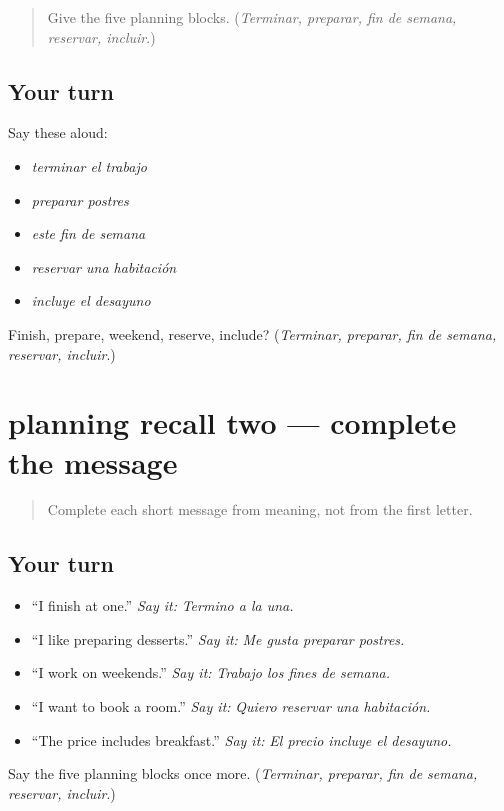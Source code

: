 \label{lesson:ES-C409-planning-recall-1}



\begin{quote}
Give the five planning blocks. (\emph{Terminar, preparar, fin de semana, reservar, incluir}.)
\end{quote}

\subsection*{Your turn}
Say these aloud:

\begin{itemize}
\raggedright
  \item \emph{terminar el trabajo}
  \item \emph{preparar postres}
  \item \emph{este fin de semana}
  \item \emph{reservar una habitación}
  \item \emph{incluye el desayuno}
\end{itemize}

\begin{tcolorbox}[breakable,colback=teal!4,colframe=teal!35!black,title={Before you move on}]
Finish, prepare, weekend, reserve, include? (\emph{Terminar, preparar, fin de semana, reservar, incluir}.)
\end{tcolorbox}
\section[(review)]{planning recall two — complete the message}

\label{lesson:ES-C409-planning-recall-2}



\begin{quote}
Complete each short message from meaning, not from the first letter.
\end{quote}

\subsection*{Your turn}
\begin{itemize}
\raggedright
  \item “I finish at one.” \emph{Say it:} \emph{Termino a la una.}
  \item “I like preparing desserts.” \emph{Say it:} \emph{Me gusta preparar postres.}
  \item “I work on weekends.” \emph{Say it:} \emph{Trabajo los fines de semana.}
  \item “I want to book a room.” \emph{Say it:} \emph{Quiero reservar una habitación.}
  \item “The price includes breakfast.” \emph{Say it:} \emph{El precio incluye el desayuno.}
\end{itemize}

\begin{tcolorbox}[breakable,colback=teal!4,colframe=teal!35!black,title={Before you move on}]
Say the five planning blocks once more. (\emph{Terminar, preparar, fin de semana, reservar, incluir}.)
\end{tcolorbox}
